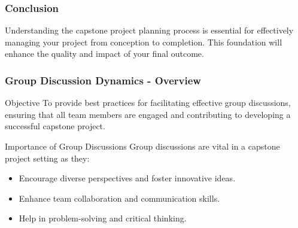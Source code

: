 \documentclass{beamer}
\begin{document}
\begin{frame}[fragile]
    \frametitle{Conclusion}
    Understanding the capstone project planning process is essential for effectively managing your project from conception to completion. This foundation will enhance the quality and impact of your final outcome.
\end{frame}

\begin{frame}[fragile]
    \frametitle{Group Discussion Dynamics - Overview}
    \begin{block}{Objective}
            To provide best practices for facilitating effective group discussions, ensuring that all team members are engaged and contributing to developing a successful capstone project.
    \end{block}
    
    \begin{block}{Importance of Group Discussions}
        Group discussions are vital in a capstone project setting as they:
        \begin{itemize}
            \item Encourage diverse perspectives and foster innovative ideas.
            \item Enhance team collaboration and communication skills.
            \item Help in problem-solving and critical thinking.
        \end{itemize}
    \end{block}
\end{frame}
\end{document}
